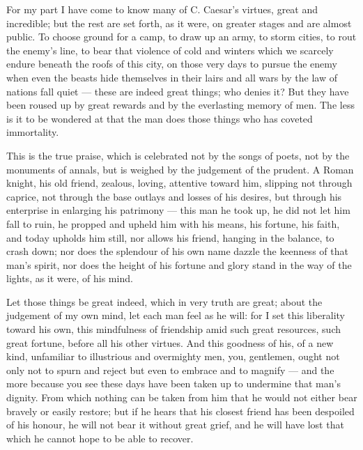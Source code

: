  For my part I have come to know many of C. Caesar's virtues, great and incredible; but the rest are set forth, as it were, on greater stages and are almost public. To choose ground for a camp, to draw up an army, to storm cities, to rout the enemy's line, to bear that violence of cold and winters which we scarcely endure beneath the roofs of this city, on those very days to pursue the enemy when even the beasts hide themselves in their lairs and all wars by the law of nations fall quiet --- these are indeed great things; who denies it? But they have been roused up by great rewards and by the everlasting memory of men. The less is it to be wondered at that the man does those things who has coveted immortality.

 This is the true praise, which is celebrated not by the songs of poets, not by the monuments of annals, but is weighed by the judgement of the prudent. A Roman knight, his old friend, zealous, loving, attentive toward him, slipping not through caprice, not through the base outlays and losses of his desires, but through his enterprise in enlarging his patrimony --- this man he took up, he did not let him fall to ruin, he propped and upheld him with his means, his fortune, his faith, and today upholds him still, nor allows his friend, hanging in the balance, to crash down; nor does the splendour of his own name dazzle the keenness of that man's spirit, nor does the height of his fortune and glory stand in the way of the lights, as it were, of his mind.

 Let those things be great indeed, which in very truth are great; about the judgement of my own mind, let each man feel as he will: for I set this liberality toward his own, this mindfulness of friendship amid such great resources, such great fortune, before all his other virtues. And this goodness of his, of a new kind, unfamiliar to illustrious and overmighty men, you, gentlemen, ought not only not to spurn and reject but even to embrace and to magnify --- and the more because you see these days have been taken up to undermine that man's dignity. From which nothing can be taken from him that he would not either bear bravely or easily restore; but if he hears that his closest friend has been despoiled of his honour, he will not bear it without great grief, and he will have lost that which he cannot hope to be able to recover.

